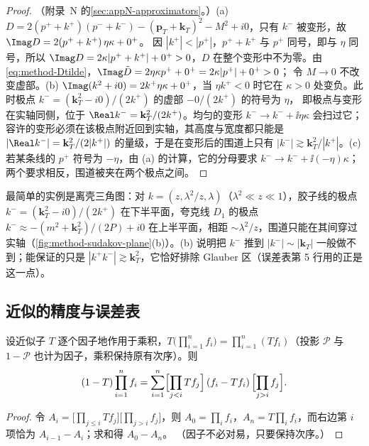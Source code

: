 \begin{proof}
（附录~N 的\cref{sec:appN-approximators}。）(a) $D=2(p^++k^+)(p^-+k^-)-(\mathbf p_T+\mathbf k_T)^2-M^2+i0$，只有 $k^-$ 被变形，故 $\Imag D=2(p^++k^+)\,\eta\kappa+0^+$。
因 $|k^+|<|p^+|$，$p^++k^+$ 与 $p^+$ 同号，即与 $\eta$ 同号，所以 $\Imag D=2\kappa|p^++k^+|+0^+>0$，$D$ 在整个变形中不为零。由\cref{eq:method-Dtilde}，$\Imag\tilde D=2\eta\kappa p^++0^+=2\kappa|p^+|+0^+>0$；
令 $M\to0$ 不改变虚部。(b) $\Imag(k^2+i0)=2k^+\eta\kappa+0^+$，当 $\eta k^+<0$ 时它在 $\kappa>0$ 处变负。此时极点 $k^-=(\mathbf k_T^2-i0)/(2k^+)$ 的虚部 $-0/(2k^+)$ 的符号为 $\eta$，
即极点与变形在实轴同侧，位于 $\Real k^-=\mathbf k_T^2/(2k^+)$。均匀的变形 $k^-\to k^-+\ii\eta\kappa$ 会扫过它；容许的变形必须在该极点附近回到实轴，其高度与宽度都只能是
$|\Real k^-|=\mathbf k_T^2/(2|k^+|)$ 的量级，于是在变形后的围道上只有 $|k^-|\gtrsim\mathbf k_T^2/|k^+|$。(c) 若某条线的 $p^+$ 符号为 $-\eta$，由 (a) 的计算，它的分母要求 $k^-\to k^-+\ii(-\eta)\kappa$；
两个要求相反，围道被夹在两个极点之间。
\end{proof}

最简单的实例是离壳三角图：对 $k=(z,\lambda^2/z,\lambda)$（$\lambda^2\ll z\ll1$），胶子线的极点 $k^-=(\mathbf k_T^2-i0)/(2k^+)$ 在下半平面，夸克线 $D_1$ 的极点 $k^-\approx-(m^2+\mathbf k_T^2)/(2P)+i0$
在上半平面，相距 $\sim\lambda^2/z$，围道只能在其间穿过实轴（\cref{fig:method-sudakov-plane}(b)）。(b) 说明把 $k^-$ 推到 $|k^-|\sim|\mathbf k_T|$ 一般做不到；能保证的只是
$|k^+k^-|\gtrsim\mathbf k_T^2$，它恰好排除 Glauber 区（误差表第 5 行用的正是这一点）。

\subsection{近似的精度与误差表}

\begin{lemma}[乘积的伸缩恒等式]\label{lem:method-telescoping}
设近似子 $T$ 逐个因子地作用于乘积，$T\bigl(\prod_{i=1}^nf_i\bigr)=\prod_{i=1}^n(Tf_i)$（投影 $\mathcal P$ 与 $1-\mathcal P$ 也计为因子，乘积保持原有次序）。则
\begin{equation}\label{eq:method-telescoping}
(1-T)\prod_{i=1}^nf_i=\sum_{i=1}^n\Bigl[\prod_{j<i}Tf_j\Bigr]\,(f_i-Tf_i)\,\Bigl[\prod_{j>i}f_j\Bigr].
\end{equation}
\end{lemma}

\begin{proof}
令 $A_i=\bigl[\prod_{j\le i}Tf_j\bigr]\bigl[\prod_{j>i}f_j\bigr]$，则 $A_0=\prod_if_i$，$A_n=T\prod_if_i$，而右边第 $i$ 项恰为 $A_{i-1}-A_i$；求和得 $A_0-A_n$。
（因子不必对易，只要保持次序。）
\end{proof}

